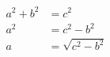 \begin{equation}
   \begin{split}
   a^2 + b^2 &= c^2 \\
   a^2 &= c^2 - b^2\\
   a &= \sqrt{c^2 - b^2}\\ 
   \end{split}
\end{equation}